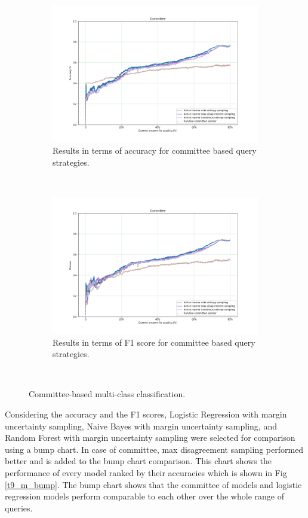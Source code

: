 \begin{figure}[!htb]
	\begin{subfigure}[b]{0.5\textwidth}
		\includegraphics[width=\textwidth]{images/task9_accuracy_com}
		\caption{Results in terms of accuracy for committee based query strategies.}
		\label{t9_m_com}
	\end{subfigure}
	~
	\begin{subfigure}[b]{0.5\textwidth}
		\includegraphics[width=\textwidth]{images/task9_f1score_com}
		\caption{Results in terms of F1 score for committee based query strategies.}
		\label{t9_m_com_f1}
	\end{subfigure}
	~
	\caption{Committee-based multi-class classification.}
\end{figure}

Considering the accuracy and the F1 scores, Logistic Regression with margin uncertainty sampling, Naive Bayes with margin uncertainty sampling, and Random Forest with margin uncertainty sampling were selected for comparison using a bump chart. In case of committee, max disagreement sampling performed better and is added to the bump chart comparison. This chart shows the performance of every model ranked by their accuracies which is shown in Fig \ref{t9_m_bump}. The bump chart shows that the committee of models and logistic regression models perform comparable to each other over the whole range of queries.

